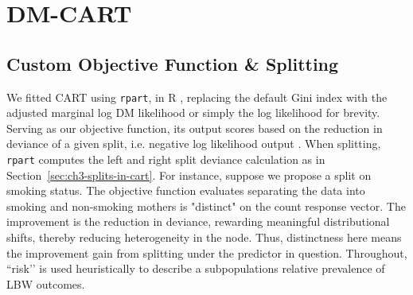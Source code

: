\section{DM-CART}
\label{sec:ch3-dm-cart}
\subsection{Custom Objective Function \& Splitting}
\label{sec:ch3-objective-function}
We fitted CART using \texttt{rpart}, in R \parencite{rpart_docs}, replacing the default Gini index with the adjusted marginal log DM likelihood or simply the log likelihood for brevity. Serving as our objective function, its output scores based on the reduction in deviance of a given split, i.e. negative log likelihood output \parencite{rpart_docs, intro_to_rpart}. When splitting, \texttt{rpart} computes the left and right split deviance calculation as in Section~\ref{sec:ch3-splits-in-cart}. For instance, suppose we propose a split on smoking status. The objective function evaluates separating the data into smoking and non-smoking mothers is "distinct" on the count response vector. The improvement is the reduction in deviance, rewarding meaningful distributional shifts, thereby reducing heterogeneity in the node. Thus, distinctness here means the improvement gain from splitting under the predictor in question. Throughout, “risk’’ is used heuristically to describe a subpopulations relative prevalence of LBW outcomes.

